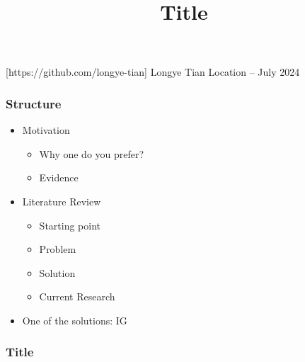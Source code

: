 \documentclass[11pt,xcolor={dvipsnames},hyperref={pdftex,pdfpagemode=UseNone,hidelinks,pdfdisplaydoctitle=true},usepdftitle=false]{beamer}
\begin{document}
\title{Title}

\information
%
[https://github.com/longye-tian]
%
{Longye Tian}
%
{Location -- July 2024}

\frame{\titlepage}

\begin{frame}
\frametitle{Structure}
\begin{itemize}
\item Motivation
\begin{itemize}
\item Why one do you prefer?
\item Evidence
\end{itemize}
\item Literature Review
\begin{itemize}
\item Starting point
\item Problem
\item Solution
\item Current Research
\end{itemize}
\item One of the solutions: IG
\end{itemize}
\end{frame}

\begin{frame}
\frametitle{Title}
\end{frame}
\end{document}
